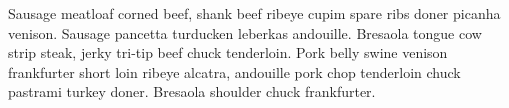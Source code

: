
Sausage meatloaf corned beef, shank beef ribeye cupim spare ribs doner picanha venison. Sausage
pancetta turducken leberkas andouille. Bresaola tongue cow strip steak, jerky tri-tip beef chuck
tenderloin. Pork belly swine venison frankfurter short loin ribeye alcatra, andouille pork chop
tenderloin chuck pastrami turkey doner. Bresaola shoulder chuck frankfurter.